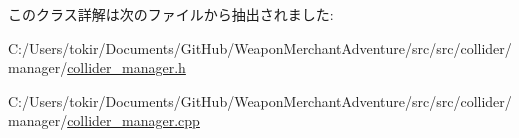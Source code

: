 このクラス詳解は次のファイルから抽出されました\+:\begin{DoxyCompactItemize}
\item 
C\+:/\+Users/tokir/\+Documents/\+Git\+Hub/\+Weapon\+Merchant\+Adventure/src/src/collider/manager/\mbox{\hyperlink{collider__manager_8h}{collider\+\_\+manager.\+h}}\item 
C\+:/\+Users/tokir/\+Documents/\+Git\+Hub/\+Weapon\+Merchant\+Adventure/src/src/collider/manager/\mbox{\hyperlink{collider__manager_8cpp}{collider\+\_\+manager.\+cpp}}\end{DoxyCompactItemize}
